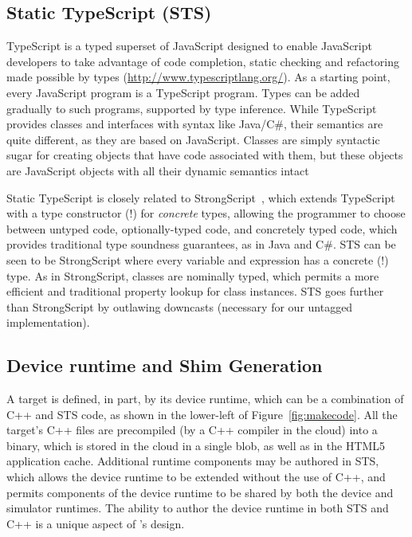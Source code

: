 \subsection{Static TypeScript (STS)}

TypeScript is a typed superset of JavaScript designed to enable JavaScript developers to take advantage of code
completion, static checking and refactoring made possible by types (\url{http://www.typescriptlang.org/}).
As a starting point, every JavaScript program is a TypeScript program.  Types can be added gradually to such programs, supported by type inference. While TypeScript provides classes and interfaces with syntax like
Java/C\#, their semantics are quite different, as they are based on JavaScript. Classes are simply syntactic sugar for creating objects that have code associated with them, but these objects are
JavaScript objects with all their dynamic semantics intact

Static TypeScript is closely related to  StrongScript~\cite{StrongScriptECOOP15},
which extends TypeScript with a type constructor (!)
for \emph{concrete} types, allowing the programmer to choose between untyped
code, optionally-typed code, and concretely typed code, which provides traditional
type soundness guarantees, as in Java and C\#.
STS can be seen to be StrongScript where every variable and
expression has a concrete (!) type. As in StrongScript, classes are nominally typed,
which permits a more efficient and traditional property lookup for class instances.
STS goes further than StrongScript by outlawing downcasts (necessary for our untagged implementation).

\subsection{Device runtime and Shim Generation}

A \MC target is defined, in part, by its device runtime, which can be a combination of C++
and STS code, as shown in the lower-left of Figure~\ref{fig:makecode}.
All the target's C++ files are precompiled (by a C++ compiler in the cloud)
into a binary, which is stored in the cloud in a single blob, as well as in the HTML5 application cache. Additional runtime
components may be authored in STS, which allows the device runtime to be extended without the
use of C++, and permits components of the device runtime to be shared by both the device
and simulator runtimes. The ability to author the device runtime in both STS and C++ is
a unique aspect of \MCN's design.

